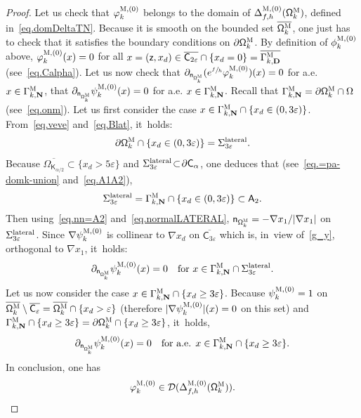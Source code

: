\documentclass[10pt]{amsart}
\newcommand{\mbf}[1]{\mathbf{#1}}
\let\pa\partial
\let\ve\varepsilon
\theoremstyle{plain}
\theoremstyle{definition}
\begin{document}
\begin{proof}
Let us check that $\varphi^{\textsc{M},(0)}_k$ belongs to the domain
of $\Delta_{f,h}^{\textsc{M}, (0)}(\mathsf \Omega_k^{\textsc{M}})$,
defined in~\eqref{eq.domDeltaTN}. Because it is smooth on the bounded set $\overline{\mathsf \Omega_k^{\textsc{M}}}$, one just has to check that it satisfies the boundary conditions on $\pa \mathsf \Omega_k^{\textsc{M}} $. By definition of $\phi^{\textsc{M},(0)}_k$ above, $\varphi^{\textsc{M},(0)}_k(x)=0$ for all $x=(\mathsf z,x_d) \in \overline{ \mathsf C_{2\ve}} \cap \{x_d =0\} = \overline{\Gamma_{k,\mbf D}^{\textsc{M}}}$ (see~\eqref{eq.Calpha}). Let us now check that $\pa _{\mathsf n_{ \mathsf \Omega_k^{\textsc{M}} }}(e^{\sfrac fh} \varphi^{\textsc{M},(0)}_k)(x)=0$ for a.e. $x\in \Gamma_{k,\mbf N}^{\textsc{M}}$, \ie that $\pa _{\mathsf n_{ \mathsf \Omega_k^{\textsc{M}} }}\psi^{\textsc{M},(0)}_k(x)=0$ for a.e. $x\in \Gamma_{k,\mbf N}^{\textsc{M}}$. Recall that $\Gamma_{k,\mbf N}^{\textsc{M}}=\pa \mathsf \Omega_k^{\textsc{M}} \cap \Omega$ (see~\eqref{eq.onm}). Let us first consider the case $x\in \Gamma_{k,\mbf N}^{\textsc{M}}\cap \{x_d\in (0,3\ve)\}$.
From~\eqref{eq.veve} and~\eqref{eq.Blat}, it~holds:
\begin{equation}\label{eq.=Sve}
\pa \mathsf \Omega_k^{\textsc{M}} \cap \{x_d\in (0,3\ve)\} =\Sigma_{3\ve}^{\textup{lateral}}.
\end{equation}
Because $\overline{\Omega_{\mathsf K_{\alpha/2}}} \!\subset\! \{x_d\!>\! 5\ve\}$ and $\Sigma_{3\ve}^{\textup{lateral}} \!\subset\! \pa \mathsf C_\alpha$, one deduces that (see~\eqref{eq.=pa-domk-union} and~\eqref{eq.A1A2}),
\[
\Sigma_{3\ve}^{\textup{lateral}}= \Gamma_{k,\mbf N}^{\textsc{M}}\cap \{x_d\in (0,3\ve)\} \subset \mathsf A_2.
\]
Then using~\eqref{eq.nn=A2} and~\eqref{eq.normalLATERAL}, $\mathsf n_{ \mathsf \Omega_k^{\textsc{M}}}=- {\nabla x_1}/ {\vert \nabla x_1\vert}$ on $\Sigma_{3\ve}^{\textup{lateral}}$. Since $\nabla \psi^{\textsc{M},(0)}_k$ is collinear to $\nabla x_d$ on $\overline{ \mathsf C_{3\ve} }$ which is, in~view of~\eqref{g_y}, orthogonal to $\nabla x_1$, it~holds:
\[
\pa _{\mathsf n_{ \mathsf \Omega_k^{\textsc{M}} }}\psi^{\textsc{M},(0)}_k(x)=0 \quad\text{for } x \in \Gamma_{k,\mbf N}^{\textsc{M}} \cap \Sigma_{3\ve}^{\textup{lateral}}.
\]
Let us now consider the case $x\in \Gamma_{k,\mbf N}^{\textsc{M}}\cap \{x_d\ge 3\ve\}$.
Because $\psi^{\textsc{M},(0)}_k=1$ on $ \overline{\mathsf \Omega_k^{\textsc{M}} }\setminus \overline{\mathsf C_{\ve}}= \overline{\mathsf \Omega_k^{\textsc{M}} }\cap\{x_d>\ve\}$ (therefore $\vert \nabla \psi^{\textsc{M},(0)}_k\vert (x)=0$ on this set) and $\Gamma_{k,\mbf N}^{\textsc{M}}\cap\{x_d\ge 3\ve\}= \pa \mathsf \Omega_k^{\textsc{M}} \cap\{x_d\ge 3\ve\}$, it~holds,
\[
\pa _{\mathsf n_{ \mathsf \Omega_k^{\textsc{M}} }}\psi^{\textsc{M},(0)}_k(x)=0 \quad\text{for a.e. } x\in \Gamma_{k,\mbf N}^{\textsc{M}}\cap\{x_d\ge 3\ve\}.
\]
In conclusion, one has
\begin{equation}\label{eq.psi-DM}
\varphi^{\textsc{M},(0)}_k \in \mathcal D(\Delta_{f,h}^{\textsc{M}, (0)}(\mathsf \Omega_k^{\textsc{M}})).
\end{equation}


\end{proof}
\end{document}
